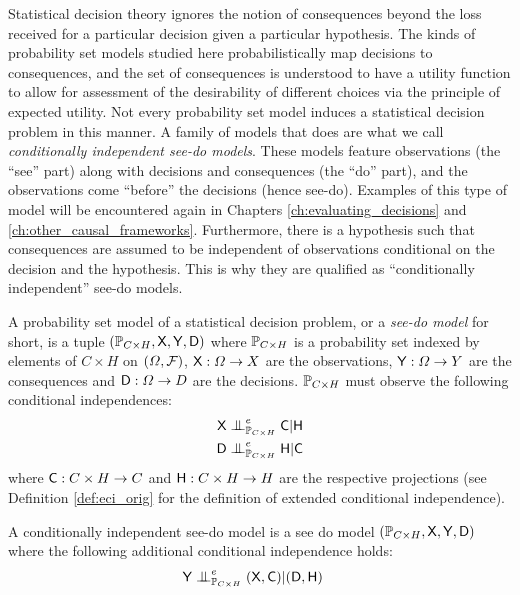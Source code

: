 Statistical decision theory ignores the notion of consequences beyond the loss received for a particular decision given a particular hypothesis. The kinds of probability set models studied here probabilistically map decisions to consequences, and the set of consequences is understood to have a utility function to allow for assessment of the desirability of different choices via the principle of expected utility. Not every probability set model induces a statistical decision problem in this manner. A family of models that does are what we call \emph{conditionally independent see-do models}. These models feature observations (the ``see'' part) along with decisions and consequences (the ``do'' part), and the observations come ``before'' the decisions (hence see-do). Examples of this type of model will be encountered again in Chapters \ref{ch:evaluating_decisions} and \ref{ch:other_causal_frameworks}. Furthermore, there is a hypothesis such that consequences are assumed to be independent of observations conditional on the decision and the hypothesis. This is why they are qualified as ``conditionally independent'' see-do models.
\begin{definition}
A probability set model of a statistical decision problem, or a \emph{see-do model} for short, is a tuple $(\mathbb{P}_{C\times H}, \mathsf{X},\mathsf{Y},\mathsf{D})$ where $\mathbb{P}_{C\times H}$ is a probability set indexed by elements of $C\times H$ on $(\Omega,\mathcal{F})$, $\mathsf{X}:\Omega\to X$ are the observations, $\mathsf{Y}:\Omega\to Y$ are the consequences and $\mathsf{D}:\Omega\to D$ are the decisions. $\mathbb{P}_{C\times H}$ must observe the following conditional independences:
\begin{align}
    \RV{X}&\CI^e_{\prob{P}_{C\times H}} \RV{C}|\RV{H}\\
    \RV{D}&\CI^e_{\prob{P}_{C\times H}} \RV{H}|\RV{C}
\end{align}
where $\mathsf{C}:C\times H\to C$ and $\mathsf{H}:C\times H\to H$ are the respective projections (see Definition \ref{def:eci_orig} for the definition of extended conditional independence).
\end{definition}
\begin{definition}
A conditionally independent see-do model is a see do model $(\mathbb{P}_{C\times H}, \mathsf{X},\mathsf{Y},\mathsf{D})$ where the following additional conditional independence holds:
\begin{align}
    \RV{Y}&\CI^e_{\prob{P}_{C\times H}} (\RV{X,C})|(\RV{D},\RV{H})
\end{align}
\end{definition}
